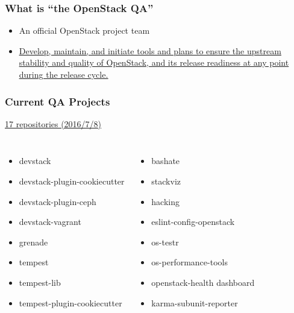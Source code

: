 \documentclass[aspectratio=43,11pt,hyperref={colorlinks=true}]{beamer}
\begin{document}
\begin{frame}
  \frametitle{What is ``the OpenStack QA''}
  \begin{itemize}
    \item An official OpenStack project team
    \item \href{https://wiki.openstack.org/wiki/QA}{\ul{Develop, maintain,
      and initiate tools and plans to ensure the upstream stability
      and quality of OpenStack, and its release readiness at any point
      during the release cycle.}}
  \end{itemize}
\end{frame}

\begin{frame}
    \frametitle{Current QA Projects}
    \href{http://governance.openstack.org/reference/projects/quality-assurance.html}{17 repositories (2016/7/8)}
    \begin{columns}
            \begin{itemize}
                \item{devstack}
                \item{devstack-plugin-cookiecutter}
                \item{devstack-plugin-ceph}
                \item{devstack-vagrant}
                \item{grenade}
                \item{tempest}
                \item{tempest-lib}
                \item{tempest-plugin-cookiecutter}
            \end{itemize}
            \begin{itemize}
                \item{bashate}
                \item{stackviz}
                \item{hacking}
                \item{eslint-config-openstack}
                \item{os-testr}
                \item{os-performance-tools}
                \item{openstack-health dashboard}
                \item{karma-subunit-reporter}
            \end{itemize}
    \end{columns}
\end{frame}
\end{document}
